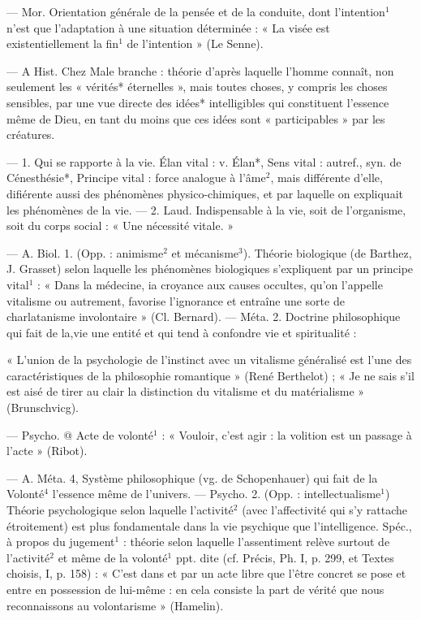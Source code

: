 \begin{itemize}[leftmargin=1cm, label=, itemsep=1pt]
 — Mor. Orientation générale
de la pensée et de la conduite, dont
l'intention$^1$ n’est que l'adaptation à
une situation déterminée : « La
visée est existentiellement la fin$^1$ de
l'intention » (Le Senne).

 — A Hist. Chez Male
branche : théorie d’après laquelle
l’homme connaît, non seulement les
« vérités* éternelles », mais toutes
choses, y compris les choses sensibles, par une vue directe des idées*
intelligibles qui constituent l'essence
même de Dieu, en tant du moins
que ces idées sont « participables »
par les créatures.

 — 1. Qui se rapporte à la vie.
Élan vital : v. Élan*, Sens vital :
autref., syn. de Cénesthésie*, Principe vital : force analogue à l'âme$^2$,
mais différente d'elle, difiérente
aussi des phénomènes physico-chimiques, et par laquelle on expliquait les phénomènes de la vie. —
2. Laud. Indispensable à la vie,
soit de l’organisme, soit du corps
social : « Une nécessité vitale. »

 — A. Biol. 1. (Opp. : animisme$^2$ et mécanisme$^3$). Théorie biologique (de Barthez, J. Grasset)
selon laquelle les phénomènes biologiques s'expliquent par un principe
vital$^1$ : « Dans la médecine, ia
croyance aux causes occultes, qu’on
l'appelle vitalisme ou autrement,
favorise l'ignorance et entraîne une
sorte de charlatanisme involontaire » (Cl. Bernard). — Méta.
2. Doctrine philosophique qui fait
de la,vie une entité et qui tend à
confondre vie et spiritualité :

« L'union de la psychologie de l’instinct avec un vitalisme généralisé
est l’une des caractéristiques de la
philosophie romantique » (René
Berthelot) ; « Je ne sais s’il est
aisé de tirer au clair la distinction
du vitalisme et du matérialisme »
(Brunschvicg).

 — Psycho. @ Acte de volonté$^1$ :
« Vouloir, c’est agir : la volition est
un passage à l'acte » (Ribot).

 — A. Méta. 4, Système
philosophique (vg. de Schopenhauer)
qui fait de la Volonté$^4$ l'essence
même de l'univers. — Psycho.
2. (Opp. : intellectualisme$^1$) Théorie
psychologique selon laquelle l’activité$^2$ (avec l’affectivité qui s'y rattache étroitement) est plus fondamentale dans la vie psychique que
l'intelligence. Spéc., à propos du
jugement$^1$ : théorie selon laquelle
l'assentiment relève surtout de l’activité$^2$ et même de la volonté$^1$ ppt.
dite (cf. Précis, Ph. I, p. 299, et
Textes choisis, I, p. 158) : « C’est
dans et par un acte libre que l'être
concret se pose et entre en possession de lui-même : en cela consiste
la part de vérité que nous reconnaissons au volontarisme » (Hamelin).


\end{itemize}
